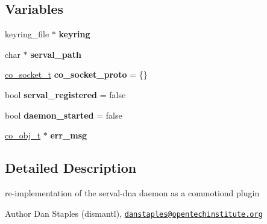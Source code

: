 \subsection*{Variables}
\begin{DoxyCompactItemize}
\item 
\hypertarget{serval-dna_8c_a7a52b0448c6882066b1f48ba930b679a}{keyring\-\_\-file $\ast$ {\bfseries keyring}}\label{serval-dna_8c_a7a52b0448c6882066b1f48ba930b679a}

\item 
\hypertarget{serval-dna_8c_ae6dcf225692e114eb5dade5319d1c2b1}{char $\ast$ {\bfseries serval\-\_\-path}}\label{serval-dna_8c_ae6dcf225692e114eb5dade5319d1c2b1}

\item 
\hypertarget{serval-dna_8c_aa3bc9a031270798ec23f3e4d5d8bd194}{\hyperlink{structco__socket__t}{co\-\_\-socket\-\_\-t} {\bfseries co\-\_\-socket\-\_\-proto} = \{\}}\label{serval-dna_8c_aa3bc9a031270798ec23f3e4d5d8bd194}

\item 
\hypertarget{serval-dna_8c_a0df258448a082ec4ee8793665db88117}{bool {\bfseries serval\-\_\-registered} = false}\label{serval-dna_8c_a0df258448a082ec4ee8793665db88117}

\item 
\hypertarget{serval-dna_8c_a67540b930502e6cd48eb1f9bf6fd9392}{bool {\bfseries daemon\-\_\-started} = false}\label{serval-dna_8c_a67540b930502e6cd48eb1f9bf6fd9392}

\item 
\hypertarget{serval-dna_8c_a35312d60364fde2d5ba79a8eb0ec7425}{\hyperlink{structco__obj__t}{co\-\_\-obj\-\_\-t} $\ast$ {\bfseries err\-\_\-msg}}\label{serval-dna_8c_a35312d60364fde2d5ba79a8eb0ec7425}

\end{DoxyCompactItemize}


\subsection{Detailed Description}
re-\/implementation of the serval-\/dna daemon as a commotiond plugin \begin{DoxyAuthor}{Author}
Dan Staples (dismantl), \href{mailto:danstaples@opentechinstitute.org}{\tt danstaples@opentechinstitute.\-org} 
\end{DoxyAuthor}


